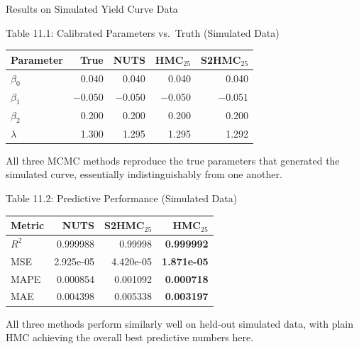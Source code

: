 \documentclass[aspectratio=169,10pt]{beamer}
\begin{document}
\begin{frame}[allowframebreaks]{Results on Simulated Yield Curve Data}

\begin{block}{Table 11.1: Calibrated Parameters vs.\ Truth (Simulated Data)}
  \begin{center}
  \begin{tabular}{lrrrr}
    \toprule
    Parameter & True & NUTS & HMC$_{25}$ & S2HMC$_{25}$ \\
    \midrule
    $\beta_0$  & 0.040  & 0.040  & 0.040  & 0.040 \\
    $\beta_1$  & $-0.050$ & $-0.050$ & $-0.050$ & $-0.051$ \\
    $\beta_2$  & 0.200  & 0.200  & 0.200  & 0.200 \\
    $\lambda$  & 1.300  & 1.295  & 1.295  & 1.292 \\
    \bottomrule
  \end{tabular}
  \end{center}
  All three MCMC methods reproduce the true parameters that generated the
  simulated curve, essentially indistinguishably from one another.
\end{block}

\begin{block}{Table 11.2: Predictive Performance (Simulated Data)}
  \begin{center}
  \begin{tabular}{lrrr}
    \toprule
    Metric & NUTS & S2HMC$_{25}$ & HMC$_{25}$ \\
    \midrule
    $R^2$   & 0.999988 & 0.99998  & \textbf{0.999992} \\
    MSE     & 2.925e-05 & 4.420e-05 & \textbf{1.871e-05} \\
    MAPE    & 0.000854 & 0.001092 & \textbf{0.000718} \\
    MAE     & 0.004398 & 0.005338 & \textbf{0.003197} \\
    \bottomrule
  \end{tabular}
  \end{center}
  All three methods perform similarly well on held-out simulated data,
  with plain HMC achieving the overall best predictive numbers here.
\end{block}

\framebreak


\end{frame}
\end{document}
